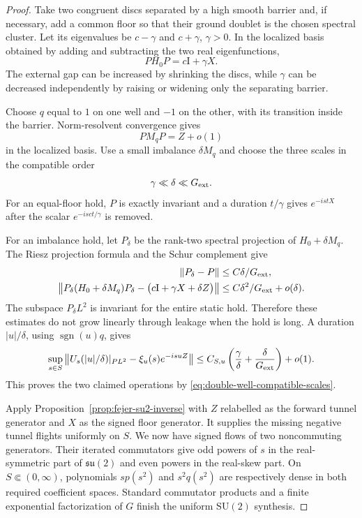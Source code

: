 \documentclass[11pt]{article}
\theoremstyle{remark}
\newcommand{\Id}{\mathrm I}
\begin{document}
\begin{proof}
Take two congruent discs separated by a high smooth barrier and, if
necessary, add a common floor so that their ground doublet is the chosen
spectral cluster.  Let its eigenvalues be $c-\gamma$ and $c+\gamma$,
$\gamma>0$.  In the localized basis obtained by adding and subtracting the
two real eigenfunctions,
\[
 PH_0P=c\Id+\gamma X.
\]
The external gap can be increased by shrinking the discs, while $\gamma$
can be decreased independently by raising or widening only the separating
barrier.

Choose $q$ equal to $1$ on one well and $-1$ on the other, with its
transition inside the barrier.  Norm-resolvent convergence gives
\[
 PM_qP=Z+o(1)
\]
in the localized basis.  Use a small imbalance $\delta M_q$ and choose the
three scales in the compatible order
\begin{equation}
 \gamma\ll\delta\ll G_{\rm ext}.
 \label{eq:double-well-compatible-scales}
\end{equation}
For an equal-floor hold, $P$ is exactly invariant and a duration
$t/\gamma$ gives $e^{-istX}$ after the scalar $e^{-isc t/\gamma}$ is
removed.

For an imbalance hold, let $P_\delta$ be the rank-two spectral projection of
$H_0+\delta M_q$.  The Riesz projection formula and the Schur complement
give
\begin{align}
 \|P_\delta-P\|&\leq C\delta/G_{\rm ext},\\
 \left\|
 P_\delta(H_0+\delta M_q)P_\delta
 -\bigl(c\Id+\gamma X+\delta Z\bigr)
 \right\|&\leq C\delta^2/G_{\rm ext}+o(\delta).
 \label{eq:double-well-static-reduction}
\end{align}
The subspace $P_\delta L^2$ is invariant for the entire static hold.
Therefore these estimates do not grow linearly through leakage when the
hold is long.  A duration $|u|/\delta$, using
$\operatorname{sgn}(u)q$, gives
\begin{equation}
 \sup_{s\in S}
 \left\|
 U_s(|u|/\delta)|_{PL^2}
 -\xi_u(s)e^{-isuZ}
 \right\|
 \leq C_{S,u}\left(
 \frac{\gamma}{\delta}+\frac{\delta}{G_{\rm ext}}\right)+o(1).
 \label{eq:double-well-signed-floor-pulse}
\end{equation}
This proves the two claimed operations by
\eqref{eq:double-well-compatible-scales}.

Apply Proposition~\ref{prop:fejer-su2-inverse} with $Z$ relabelled as the
forward tunnel generator and $X$ as the signed floor generator.  It supplies
the missing negative tunnel flights uniformly on $S$.  We now have signed
flows of two noncommuting generators.  Their iterated commutators give odd
powers of $s$ in the real-symmetric part of $\mathfrak{su}(2)$ and even
powers in the real-skew part.  On $S\Subset(0,\infty)$, polynomials
$s p(s^2)$ and $s^2q(s^2)$ are respectively dense in both required
coefficient spaces.  Standard commutator products and a finite exponential
factorization of $G$ finish the uniform $\mathrm{SU}(2)$ synthesis.
\end{proof}
\end{document}
